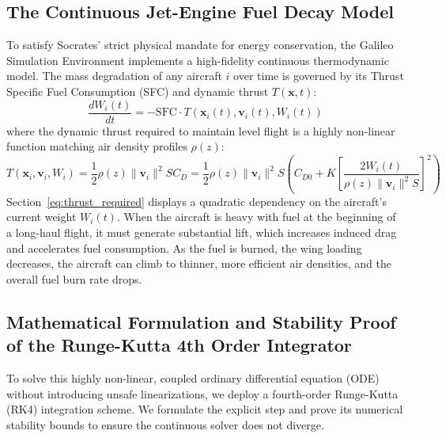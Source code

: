 \documentclass[11pt,a4paper]{book}
\begin{document}
\subsection{The Continuous Jet-Engine Fuel Decay Model}\label{subsec:fuel_decay}

To satisfy Socrates' strict physical mandate for energy conservation, the Galileo Simulation Environment implements a high-fidelity continuous thermodynamic model. The mass degradation of any aircraft $i$ over time is governed by its Thrust Specific Fuel Consumption (SFC) and dynamic thrust $T(\mathbf{x}, t)$:
\begin{equation}
\label{eq:mass_decay}
\frac{dW_{i}(t)}{dt} = - \text{SFC} \cdot T(\mathbf{x}_i(t), \mathbf{v}_i(t), W_i(t))
\end{equation}
where the dynamic thrust required to maintain level flight is a highly non-linear function matching air density profiles $\rho(z)$:
\begin{equation}
\label{eq:thrust_required}
T(\mathbf{x}_i, \mathbf{v}_i, W_i) = \frac{1}{2} \rho(z) \lVert \mathbf{v}_i \rVert^2 S C_D = \frac{1}{2} \rho(z) \lVert \mathbf{v}_i \rVert^2 S \left( C_{D0} + K \left[ \frac{2 W_i(t)}{\rho(z) \lVert \mathbf{v}_i \rVert^2 S} \right]^2 \right)
\end{equation}
Section~\ref{eq:thrust_required} displays a quadratic dependency on the aircraft's current weight $W_i(t)$. When the aircraft is heavy with fuel at the beginning of a long-haul flight, it must generate substantial lift, which increases induced drag and accelerates fuel consumption. As the fuel is burned, the wing loading decreases, the aircraft can climb to thinner, more efficient air densities, and the overall fuel burn rate drops. 

\subsection{Mathematical Formulation and Stability Proof of the Runge-Kutta 4th Order Integrator}\label{subsec:rk4_stability}

To solve this highly non-linear, coupled ordinary differential equation (ODE) without introducing unsafe linearizations, we deploy a fourth-order Runge-Kutta (RK4) integration scheme. We formulate the explicit step and prove its numerical stability bounds to ensure the continuous solver does not diverge.
\end{document}
